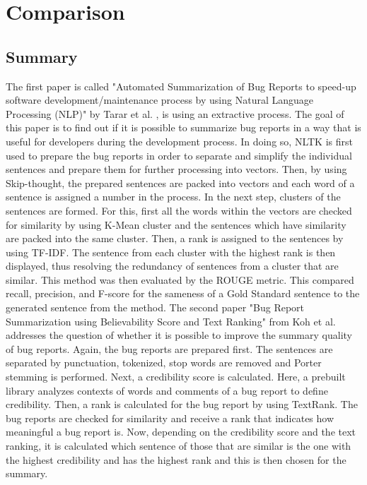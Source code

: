 \documentclass[a4paper,10pt, bibliography=totocnumbered]{scrreprt}
\begin{document}
\chapter{Comparison}
\label{comparison}
\section{Summary}
The first paper is called "Automated Summarization of Bug Reports to speed-up software development/maintenance process by using Natural Language Processing (NLP)" by Tarar et al. \cite{tarar}, is using an extractive process. The goal of this paper is to find out if it is possible to summarize bug reports in a way that is useful for developers during the development process. In doing so, NLTK is first used to prepare the bug reports in order to separate and simplify the individual sentences and prepare them for further processing into vectors. Then, by using Skip-thought, the prepared sentences are packed into vectors and each word of a sentence is assigned a number in the process. In the next step, clusters of the sentences are formed. For this, first all the words within the vectors are checked for similarity by using K-Mean cluster and the sentences which have similarity are packed into the same cluster.  Then, a rank is assigned to the sentences by using TF-IDF. The sentence from each cluster with the highest rank is then displayed, thus resolving the redundancy of sentences from a cluster that are similar. This method was then evaluated by the ROUGE metric. This compared recall, precision, and F-score for the sameness of a Gold Standard sentence to the generated sentence from the method. The second paper "Bug Report Summarization using Believability Score and Text Ranking" from Koh et al. \cite{koh} addresses the question of whether it is possible to improve the summary quality of bug reports. Again, the bug reports are prepared first. The sentences are separated by punctuation, tokenized, stop words are removed and Porter stemming is performed. Next, a credibility score is calculated. Here, a prebuilt library analyzes contexts of words and comments of a bug report to define credibility. Then, a rank is calculated for the bug report by using TextRank. The bug reports are checked for similarity and receive a rank that indicates how meaningful a bug report is. Now, depending on the credibility score and the text ranking, it is calculated which sentence of those that are similar is the one with the highest credibility and has the highest rank and this is then chosen for the summary.
\end{document}
